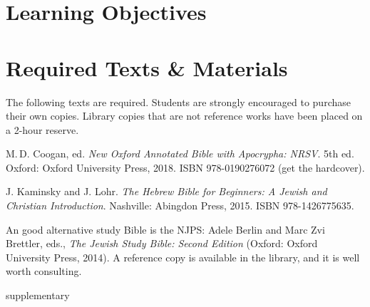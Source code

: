 \documentclass[titlepage]{article}
\newcommand\incl{../includes}
\begin{document}


  \section{Learning Objectives}
  \label{objectives}

  \edobject

\section{Required Texts \& Materials}
\label{texts}

The following texts are required. Students are strongly encouraged to
purchase their own copies. Library copies that are not reference works
have been placed on a 2-hour reserve.

\begingroup
\renewcommand{\section}[2]{}%
\begin{thebibliography}{NRSV}%

	 M.\,D. Coogan, ed.
    \emph{New Oxford Annotated Bible with Apocrypha: NRSV}. 5th ed.
    Oxford: Oxford University Press, 2018.
    ISBN 978-0190276072 (get the hardcover).

	 J. Kaminsky and J. Lohr.
	\emph{The Hebrew Bible for Beginners: A Jewish and Christian Introduction}.
	Nashville: Abingdon Press, 2015.
	ISBN 978-1426775635.



\end{thebibliography}
\endgroup

An good alternative study Bible is the NJPS: Adele Berlin and Marc Zvi
Brettler, eds., \emph{The Jewish Study Bible: Second Edition} (Oxford:
Oxford University Press, 2014). A reference copy is available in the
library, and it is well worth consulting.

\section{Supplementary Texts}
\label{supplementary}
\end{document}
